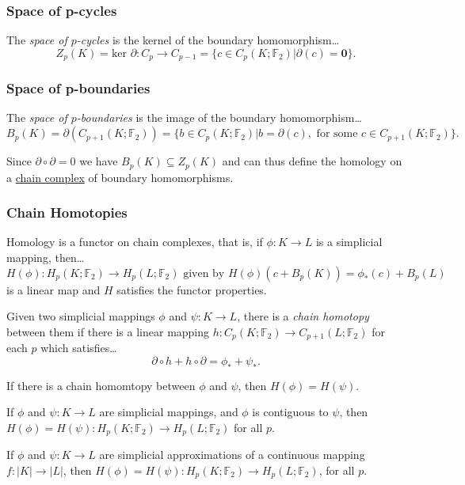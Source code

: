 \subsubsection{Space of p-cycles}\label{pcycles}
The \emph{space of $p$-cycles} is the kernel of the boundary homomorphism\dots
$$Z_p(K) = \textrm{ker }\partial : C_p \rightarrow C_{p-1} = \{ c \in C_p(K; \mathbb{F}_2) | \partial(c) = \textbf{0} \}.$$

\subsubsection{Space of p-boundaries}\label{pboundaries}
The \emph{space of $p$-boundaries} is the image of the boundary homomorphism\dots
$$B_p(K) = \partial(C_{p+1}(K; \mathbb{F}_2)) = \{ b \in C_p(K; \mathbb{F}_2) | b = \partial(c), \textrm{ for some } c \in C_{p+1}(K; \mathbb{F}_2) \}.$$\newline

\noindent Since $\partial \circ \partial = 0$ we have $B_p(K) \subseteq Z_p(K)$ and can thus define the homology on a \hyperref[complexes]{chain
complex} of boundary homomorphisms.

\subsubsection{Chain Homotopies}\label{chainhomotopy}
Homology is a functor on chain complexes, that is, if $\phi : K \rightarrow L$ is a simplicial mapping, then\dots
$$H(\phi) : H_p(K; \mathbb{F}_2) \rightarrow H_p(L; \mathbb{F}_2) \textrm{ given by } H(\phi)(c + B_p(K)) = \phi_*(c) + B_p(L)$$
is a linear map and $H$ satisfies the functor properties.\newline

\noindent Given two simplicial mappings $\phi$ and $\psi : K \rightarrow L$, there is a \emph{chain homotopy} between them if
there is a linear mapping $h : C_p(K; \mathbb{F}_2) \rightarrow C_{p+1}(L; \mathbb{F}_2)$ for each $p$ which satisfies\dots
$$\partial \circ h + h \circ \partial = \phi_* + \psi_*.$$

\begin{theorem}
If there is a chain homomtopy between $\phi$ and $\psi$, then $H(\phi) = H(\psi)$.
\end{theorem}

\begin{corollary}
If $\phi$ and $\psi : K \rightarrow L$ are simplicial mappings, and $\phi$ is contiguous to $\psi$, then
$H(\phi) = H(\psi) : H_p(K; \mathbb{F}_2) \rightarrow H_p(L;\mathbb{F}_2)$ for all $p$.
\end{corollary}

\begin{corollary}
If $\phi$ and $\psi : K \rightarrow L$ are simplicial approximations of a continuous mapping $f : |K| \rightarrow |L|$,
then $H(\phi) = H(\psi) : H_p(K; \mathbb{F}_2) \rightarrow H_p(L; \mathbb{F}_2)$, for all $p$.
\end{corollary}